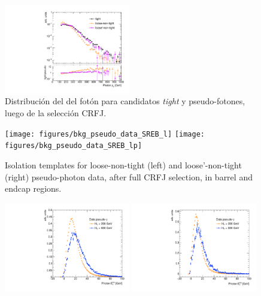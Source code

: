 \begin{figure}[h]
  \begin{center}
    \includegraphics[width=0.49\textwidth]{figures/bkg_data_pseudo_tight_data_VR}
    \caption{Distribución del {\pt} del fotón para candidatos
      \emph{tight} y pseudo-fotones, luego de la selección  CRFJ.}
  \label{fig:jetfake_pseudo_data_pt}
  \end{center}
\end{figure}

\begin{figure}[h]
  \begin{center}
    \texttt{[image: figures/bkg\_pseudo\_data\_SREB\_l]}
    \texttt{[image: figures/bkg\_pseudo\_data\_SREB\_lp]}
    \caption{Isolation templates for loose-non-tight (left) and loose'-non-tight (right) pseudo-photon data,
      after full CRFJ selection, in barrel and endcap regions.}
  \label{fig:jetfake_pseudo_data_BE}
  \end{center}
\end{figure}

\begin{figure}[h]
  \begin{center}
    \includegraphics[width=0.49\textwidth]{figures/bkg_pseudo_data_SR_VR_l}
    \includegraphics[width=0.49\textwidth]{figures/bkg_pseudo_data_SR_VR_lp}
  \label{fig:jetfake_pseudo_data_LR_VR}
  \end{center}
\end{figure}

